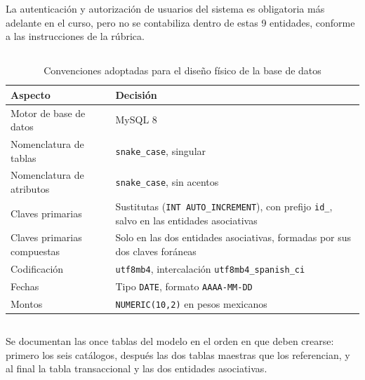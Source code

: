 \documentclass[10pt,a4paper]{article}
\begin{document}
La autenticación y autorización de usuarios del sistema es obligatoria más adelante en el curso, pero no se contabiliza dentro de estas 9 entidades, conforme a las instrucciones de la rúbrica.

\subsection{ \color{colorESCOM}{Convenciones del diseño}}

\begin{table}[H]
	\centering
	\begin{tabular}{p{4.5cm} | p{10cm}}\hline \hline
		\textbf{Aspecto} & \textbf{Decisión} \\ \hline \hline
		Motor de base de datos & MySQL 8 \cite{mysql8} \\ \hline
		Nomenclatura de tablas & \texttt{snake\_case}, singular \\ \hline
		Nomenclatura de atributos & \texttt{snake\_case}, sin acentos \\ \hline
		Claves primarias & Sustitutas (\texttt{INT AUTO\_INCREMENT}), con prefijo \texttt{id\_}, salvo en las entidades asociativas \\ \hline
		Claves primarias compuestas & Solo en las dos entidades asociativas, formadas por sus dos claves foráneas \\ \hline
		Codificación & \texttt{utf8mb4}, intercalación \texttt{utf8mb4\_spanish\_ci} \\ \hline
		Fechas & Tipo \texttt{DATE}, formato \texttt{AAAA-MM-DD} \\ \hline
		Montos & \texttt{NUMERIC(10,2)} en pesos mexicanos \\ \hline \hline
	\end{tabular}
	\caption{Convenciones adoptadas para el diseño físico de la base de datos}
	\label{tabla:convenciones}
\end{table}

\subsection{ \color{colorESCOM}{Diccionario de datos}}
\label{sec:diccionario}

Se documentan las once tablas del modelo en el orden en que deben crearse: primero los seis catálogos, después las dos tablas maestras que los referencian, y al final la tabla transaccional y las dos entidades asociativas.

\end{document}
